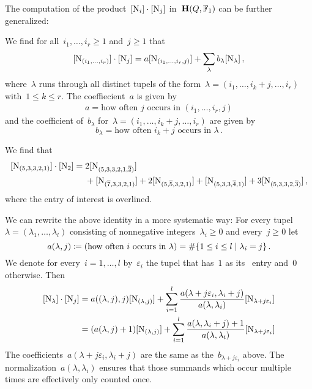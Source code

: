 \documentclass[a4paper, 11pt, twoside=semi]{scrartcl}
\begin{document}
The computation of the product~$[\mathrm{N}_i] \cdot [\mathrm{N}_j]$ in~$\mathbf{H}(Q, \mathbb{F}_1)$ can be further generalized:

We find for all~$i_1, \dotsc, i_r \geq 1$ and~$j \geq 1$ that
\[
  [ \mathrm{N}_{(i_1, \dotsc, i_r)} ] \cdot [ \mathrm{N}_j ]
  =
  a [ \mathrm{N}_{(i_1, \dotsc, i_r, j)} ]
  +
  \sum_{\lambda} b_\lambda [ \mathrm{N}_\lambda ] \,,
\]
where~$\lambda$ runs through all distinct tupels of the form~$\lambda = (i_1, \dotsc, i_k + j, \dotsc, i_r)$ with~$1 \leq k \leq r$.
The coeffiecient~$a$ is given by
\begin{align*}
  a
  =
  \text{how often~$j$ occurs in~$(i_1, \dotsc, i_r, j)$}
\end{align*}
and the coefficient of~$b_\lambda$ for~$\lambda = (i_1, \dotsc, i_k + j, \dotsc, i_r)$ are given by
\[
  b_\lambda
  =
  \text{how often~$i_k + j$ occurs in~$\lambda$} \,.
\]

\begin{example}
  We find that 
  \begin{align*}
    [ \mathrm{N}_{(5, 3, 3, 2, 1)} ] \cdot [ \mathrm{N}_2 ]
    ={}&
      2 [ \mathrm{N}_{(5, 3, 3, 2, 1, \overline{2})} ]
    \\
    {}&
    +   [ \mathrm{N}_{(\overline{7}, 3, 3, 2, 1)} ]
    + 2 [ \mathrm{N}_{(5, \overline{5}, 3, 2, 1)} ]
    +   [ \mathrm{N}_{(5, 3, 3, \overline{4}, 1)} ]
    + 3 [ \mathrm{N}_{(5, 3, 3, 2, \overline{3})} ] \,,
  \end{align*}
  where the entry of interest is overlined.
\end{example}

We can rewrite the above identity in a more systematic way:
For every tupel~$\lambda = (\lambda_1, \dotsc, \lambda_l)$ consisting of nonnegative integers~$\lambda_i \geq 0$ and every~$j \geq 0$ let
\[
  a(\lambda, j)
  \defined
  ( \text{how often~$i$ occurs in~$\lambda$} )
  =
  \counting
  \{
    1 \leq i \leq l
  \suchthat
    \lambda_i = j
  \} \,.
\]
We denote for every~$i = 1, \dotsc, l$ by~$\varepsilon_i$ the tupel that has~$1$ as its~ entry and~$0$ otherwise.
Then
\begin{align}
  \label{product formula for representations}
  [\mathrm{N}_\lambda] \cdot [\mathrm{N}_j]
  &=
  a((\lambda, j), j) [ \mathrm{N}_{(\lambda, j)} ]
  +
  \sum_{i=1}^l
  \frac{ a(\lambda + j \varepsilon_i, \lambda_i + j) }{ a(\lambda, \lambda_i) }
  [ \mathrm{N}_{\lambda + j \varepsilon_i} ]
  \\
  &=
  (a(\lambda,j) + 1) [ \mathrm{N}_{(\lambda, j)} ]
  +
  \sum_{i=1}^l
  \frac{ a(\lambda, \lambda_i + j) + 1 }{ a(\lambda, \lambda_i) }
  [ \mathrm{N}_{\lambda + j \varepsilon_i} ]
  \notag
\end{align}
The coefficients~$a(\lambda + j \varepsilon_i, \lambda_i + j)$ are the same as the~$b_{\lambda + j \varepsilon_i}$ above.
The normalization~$a(\lambda, \lambda_i)$ ensures that those summands which occur multiple times are effectively only counted once.
\end{document}
